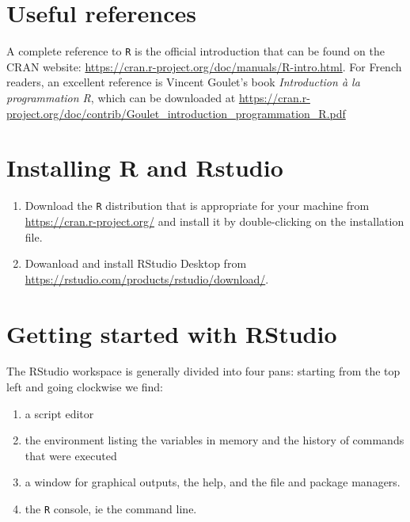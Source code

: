 \documentclass[]{book}
\providecommand{\tightlist}{%
  \setlength{\itemsep}{0pt}\setlength{\parskip}{0pt}}
\begin{document}
\hypertarget{useful-references}{%
\section{Useful references}\label{useful-references}}

A complete reference to \texttt{R} is the official introduction that can be found on the CRAN website: \url{https://cran.r-project.org/doc/manuals/R-intro.html}. For French readers, an excellent reference is Vincent Goulet's book \emph{Introduction à la programmation R}, which can be downloaded at \url{https://cran.r-project.org/doc/contrib/Goulet_introduction_programmation_R.pdf}

\hypertarget{installing-r-and-rstudio}{%
\section{Installing R and Rstudio}\label{installing-r-and-rstudio}}

\begin{enumerate}
\def\labelenumi{\arabic{enumi}.}
\tightlist
\item
  Download the \texttt{R} distribution that is appropriate for your machine from \url{https://cran.r-project.org/} and install it by double-clicking on the installation file.
\item
  Dowanload and install RStudio Desktop from \url{https://rstudio.com/products/rstudio/download/}.
\end{enumerate}

\hypertarget{getting-started-with-rstudio}{%
\section{Getting started with RStudio}\label{getting-started-with-rstudio}}

The RStudio workspace is generally divided into four pans: starting from the top left and going clockwise we find:

\begin{enumerate}
\def\labelenumi{\arabic{enumi}.}
\tightlist
\item
  a script editor
\item
  the environment listing the variables in memory and the history of commands that were executed
\item
  a window for graphical outputs, the help, and the file and package managers.
\item
  the \texttt{R} console, ie the command line.
\end{enumerate}
\end{document}
